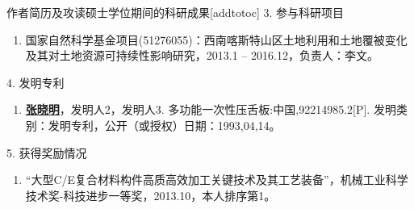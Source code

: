 \begin{personalcv}{作者简历及攻读硕士学位期间的科研成果}[addtotoc]
3. 参与科研项目
\begin{enumerate}[nosep, label=$\lbrack$\arabic*$\rbrack$]
  \item{国家自然科学基金项目(51276055)：西南喀斯特山区土地利用和土地覆被变化及其对土地资源可持续性影响研究，2013.1 – 2016.12，负责人：李文。} %
\end{enumerate}{}\vspace{1em}

4. 发明专利
\begin{enumerate}[nosep, label=$\lbrack$\arabic*$\rbrack$]
  \item{\underline{\bf 张晓明}，发明人2，发明人3. 多功能一次性压舌板:中国,92214985.2[P]. 发明类别：发明专利，公开（或授权）日期：1993,04,14。}
\end{enumerate}{}\vspace{1em}

5. 获得奖励情况
\begin{enumerate}[nosep, label=$\lbrack$\arabic*$\rbrack$]
  \item{“大型C/E复合材料构件高质高效加工关键技术及其工艺装备”，机械工业科学技术奖-科技进步一等奖，2013.10，本人排序第1。}
\end{enumerate}

\end{personalcv}



